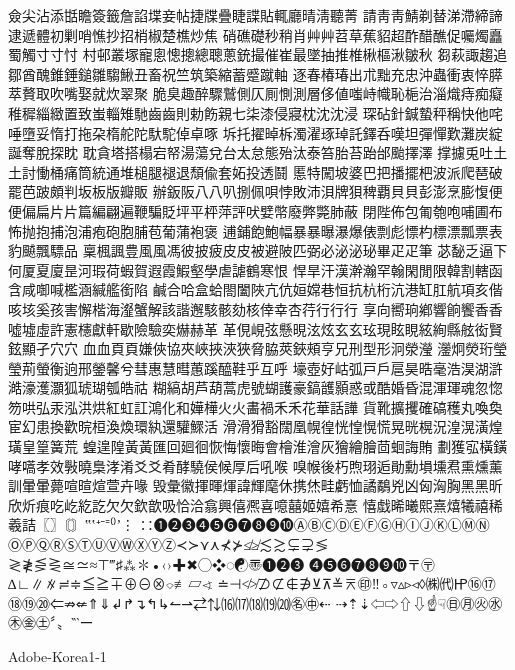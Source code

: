 僉尖沾添甛瞻簽籤詹諂堞妾帖捷牒疊睫諜貼輒廳晴淸聽菁
請⾭靑鯖剃替涕滯締諦逮遞體初剿哨憔抄招梢椒楚樵炒焦
硝礁礎秒稍肖⾋艸苕草蕉貂超酢醋醮促囑燭矗蜀觸⼨寸忖
村邨叢塚寵悤憁摠總聰蔥銃撮催崔最墜抽推椎楸樞湫皺秋
芻萩諏趨追鄒酋醜錐錘鎚雛騶鰍丑畜祝竺筑築縮蓄蹙蹴軸
逐春椿瑃出朮黜充忠沖蟲衝衷悴膵萃贅取吹嘴娶就炊翠聚
脆臭趣醉驟鷲側仄厠惻測層侈値嗤峙幟恥梔治淄熾痔痴癡
稚穉緇緻置致蚩輜雉馳⿒齒則勅飭親七柒漆侵寢枕沈沈浸
琛砧針鍼蟄秤稱快他咤唾墮妥惰打拖朶楕舵陀馱駝倬卓啄
坼托擢晫柝濁濯琢琸託鐸呑嘆坦彈憚歎灘炭綻誕奪脫探眈
耽貪塔搭榻宕帑湯蕩兌台太怠態殆汰泰笞胎苔跆邰颱擇澤
撑攄兎吐⼟土討慟桶痛筒統通堆槌腿褪退頹偸套妬投透鬪
慝特闖坡婆巴把播擺杷波派爬琶破罷芭跛頗判坂板版瓣販
辦鈑阪⼋八叭捌佩唄悖敗沛浿牌狽稗覇⾙貝彭澎烹膨愎便
便偏扁⽚片篇編翩遍鞭騙貶坪平枰萍評吠嬖幣廢弊斃肺蔽
閉陛佈包匍匏咆哺圃布怖抛抱捕泡浦疱砲胞脯苞葡蒲袍褒
逋鋪飽鮑幅暴暴曝瀑爆俵剽彪慓杓標漂瓢票表豹飇飄驃品
稟楓諷豊⾵風馮彼披疲⽪皮被避陂匹弼必泌泌珌畢⽦疋筆
苾馝乏逼下何厦夏廈昰河瑕荷蝦賀遐霞鰕壑學虐謔鶴寒恨
悍旱汗漢澣瀚罕翰閑閒限韓割轄函含咸啣喊檻涵緘艦銜陷
鹹合哈盒蛤閤闔陜亢伉姮嫦巷恒抗杭桁沆港缸肛航項亥偕
咳垓奚孩害懈楷海瀣蟹解該諧邂駭骸劾核倖幸杏荇⾏行行
享向嚮珦鄕響餉饗⾹香噓墟虛許憲櫶獻軒歇險驗奕爀赫⾰
革俔峴弦懸晛泫炫⽞玄玹現眩睍絃絢縣舷衒賢鉉顯孑⽳穴
⾎血⾴頁嫌俠協夾峽挾浹狹脅脇莢鋏頰亨兄刑型形泂滎瀅
灐炯熒珩瑩瑩荊螢衡逈邢鎣馨兮彗惠慧暳蕙蹊醯鞋乎互呼
壕壺好岵弧⼾戶扈昊晧毫浩淏湖滸澔濠濩灝狐琥瑚瓠皓祜
糊縞胡芦葫蒿虎號蝴護豪鎬頀顥惑或酷婚昏混渾琿魂忽惚
笏哄弘汞泓洪烘紅虹訌鴻化和嬅樺⽕火畵禍⽲禾花華話譁
貨靴擴攫確碻穫丸喚奐宦幻患換歡晥桓渙煥環紈還驩鰥活
滑滑猾豁闊凰幌徨恍惶愰慌晃晄榥況湟滉潢煌璜皇篁簧荒
蝗遑隍⿈黃匯回廻徊恢悔懷晦會檜淮澮灰獪繪膾茴蛔誨賄
劃獲宖橫鐄哮嚆孝效斅曉梟涍淆⽘爻肴酵驍侯候厚后吼喉
嗅帿後朽煦珝逅勛勳塤壎焄熏燻薰訓暈暈薨喧暄煊萱卉喙
毁彙徽揮暉煇諱輝麾休携烋畦虧恤譎鷸兇凶匈洶胸⿊黑昕
欣炘痕吃屹紇訖⽋欠欽歆吸恰洽翕興僖凞喜噫囍姬嬉希憙
憘戱晞曦熙熹熺犧禧稀羲詰〖〗〘〙‟‛⁺⁻⁼⁽⁾ʼ⋮
∷➊➋➌➍➎➏➐➑➒➓ⒶⒷⒸⒹⒺⒻⒼⒽⒾⒿⓀⓁⓂⓃ
ⓄⓅⓆⓇⓈⓉⓊⓋⓌⓍⓎⓏ≺≻⋎⋏⊀⊁≰≱≲≳⊊⊋≶
≷≹⋚⋛≅≃≈⊤‴♯⁂✽•‹›✚✖◯❖◌☯〠❶❷❸
❹❺❻❼❽❾❿〒〶∆∟∥∦≓≑≦≧∓⊕⊖⊗⌔≢▱∢
≐⊣≮≯⊅⊄∉∌⊻⊼≚⌆㊞‼◦▿▵▹◃◊㈱㈹㏋⑯⑰
⑱⑲⑳⇐⇏⇍⇑⇓↲↱↴↰↳↼⇀⇄⇅⒃⒄⒅⒆⒇㊔㊥⇠
⇢⇡⇣⇦⇨⇧⇩☝☟㊐㊊㊋㊌㊍㊎㊏〞〟‶‵ー

Adobe-Korea1-1

